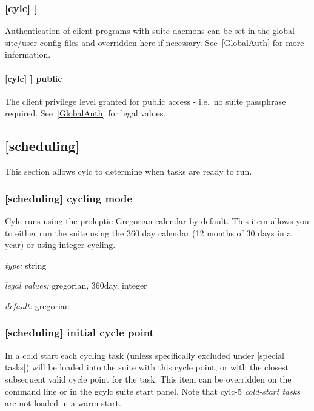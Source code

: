 \subsubsection[{[[}authentication{]]}]{[cylc] \textrightarrow [[authentication]] }
\label{SuiteAuth}

Authentication of client programs with suite daemons can be set in the
global site/user config files and overridden here if necessary.
See~\ref{GlobalAuth} for more information.

\paragraph[public]{[cylc] \textrightarrow [[authentication]] \textrightarrow public}

The client privilege level granted for public access - i.e.\ no suite passphrase
required.  See~\ref{GlobalAuth} for legal values.

\subsection{[scheduling]}

This section allows cylc to determine when tasks are ready to run.

\subsubsection[cycling]{ [scheduling] \textrightarrow cycling mode }
\label{cycling-mode}

Cylc runs using the proleptic Gregorian calendar by default. This item allows
you to either run the suite using the 360 day calendar (12 months of 30 days
in a year) or using integer cycling.

\begin{myitemize}
    \item {\em type:} string
    \item {\em legal values:} gregorian, 360day, integer
    \item {\em default:} gregorian

\end{myitemize}

\subsubsection[initial cycle point]{[scheduling] \textrightarrow initial cycle point}
\label{initial cycle point}

In a cold start each cycling task (unless specifically excluded under
[special tasks]) will be loaded into the suite with this cycle point,
or with the closest subsequent valid cycle point for the task.  This item can
be overridden on the command line or in the gcylc suite start panel.  Note that
cylc-5 {\em cold-start tasks} are not loaded in a warm start.

